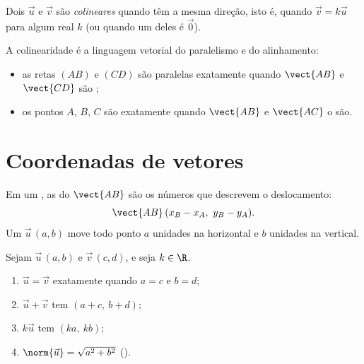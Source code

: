 \begin{definition}[Colinearidade]\label{def:g10:vectors:collinear}
Dois  $\vec u$ e $\vec v$ são
\emph{colineares} quando têm a mesma direção,
isto é, quando $\vec v = k \vec u$ para algum real $k$ (ou quando um
deles é $\vec 0$).
\end{definition}

\begin{remark}
A colinearidade é a linguagem vetorial do paralelismo e do alinhamento:
\begin{itemize}
  \item as retas $(AB)$ e $(CD)$ são paralelas exatamente quando
        $\vect{AB}$ e $\vect{CD}$ são ;
  \item os pontos $A$, $B$, $C$ são  exatamente quando
        $\vect{AB}$ e $\vect{AC}$ o são.
\end{itemize}
\end{remark}

\section{Coordenadas de vetores}

\begin{definition}\label{def:g10:vectors:coords}
Em um , as \emph{} do  $\vect{AB}$
são os números que descrevem o deslocamento:
\[
\vect{AB}\,(x_B - x_A,\ y_B - y_A).
\]
Um  $\vec u\,(a, b)$ move todo ponto $a$ unidades na horizontal e
$b$ unidades na vertical.
\end{definition}

\begin{proposition}\label{prop:g10:vectors:coordrules}
Sejam $\vec u\,(a, b)$ e $\vec v\,(c, d)$, e seja $k \in \R$.
\begin{enumerate}
  \item $\vec u = \vec v$ exatamente quando $a = c$ e $b = d$;
  \item $\vec u + \vec v$ tem  $(a + c,\ b + d)$;
  \item $k\vec u$ tem  $(ka,\ kb)$;
  \item $\norm{\vec u} = \sqrt{a^2 + b^2}$ ().
\end{enumerate}
\end{proposition}


